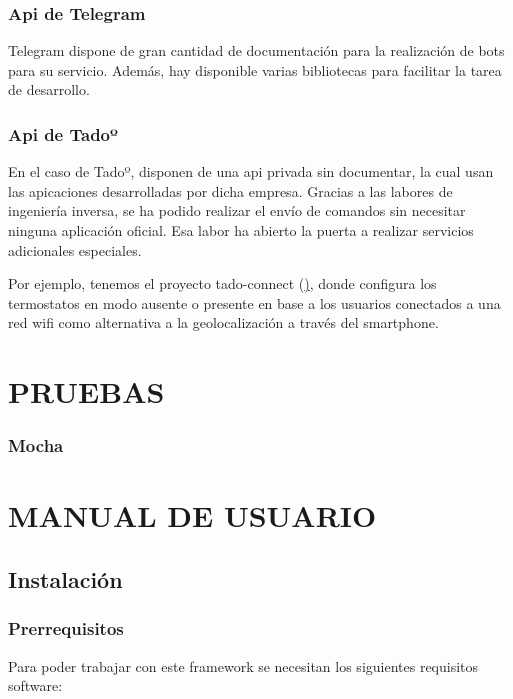 \documentclass[spanish,12pt, a4paper, twoside]{paper}
\let\oldsection\section
\def\section{\cleardoublepage\oldsection}
\begin{document}
\subsubsection{Api de Telegram}

Telegram dispone de gran cantidad de documentación para la realización de bots para su servicio. Además, hay disponible varias bibliotecas para facilitar la tarea de desarrollo.

\subsubsection{Api de Tadoº}

En el caso de Tadoº, disponen de una api privada sin documentar, la cual usan las apicaciones desarrolladas por dicha empresa. Gracias a las labores de ingeniería inversa, se ha podido realizar el envío de comandos sin necesitar ninguna aplicación oficial. Esa labor ha abierto la puerta a realizar servicios adicionales especiales.

Por ejemplo, tenemos el proyecto tado-connect (\href{https://github.com/Martijn02/tado-connect}), donde configura los termostatos en modo ausente o presente en base a los usuarios conectados a una red wifi como alternativa a la geolocalización a través del smartphone.

\section{PRUEBAS}

\subsubsection{Mocha}

\section{MANUAL DE USUARIO}

\subsection{Instalación}

\subsubsection{Prerrequisitos}

Para poder trabajar con este framework se necesitan los siguientes requisitos software:
\end{document}
